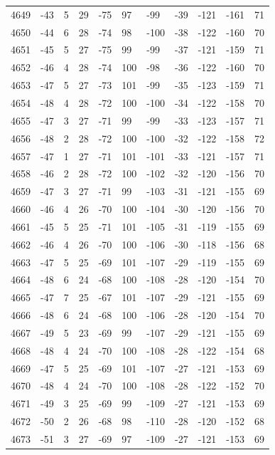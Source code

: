 \begin{table}[H]
\begin{tabular}{lllllllllll}
4649 & -43 & 5 & 29 & -75 & 97 & -99 & -39 & -121 & -161 & 71 \\
4650 & -44 & 6 & 28 & -74 & 98 & -100 & -38 & -122 & -160 & 70 \\
4651 & -45 & 5 & 27 & -75 & 99 & -99 & -37 & -121 & -159 & 71 \\
4652 & -46 & 4 & 28 & -74 & 100 & -98 & -36 & -122 & -160 & 70 \\
4653 & -47 & 5 & 27 & -73 & 101 & -99 & -35 & -123 & -159 & 71 \\
4654 & -48 & 4 & 28 & -72 & 100 & -100 & -34 & -122 & -158 & 70 \\
4655 & -47 & 3 & 27 & -71 & 99 & -99 & -33 & -123 & -157 & 71 \\
4656 & -48 & 2 & 28 & -72 & 100 & -100 & -32 & -122 & -158 & 72 \\
4657 & -47 & 1 & 27 & -71 & 101 & -101 & -33 & -121 & -157 & 71 \\
4658 & -46 & 2 & 28 & -72 & 100 & -102 & -32 & -120 & -156 & 70 \\
4659 & -47 & 3 & 27 & -71 & 99 & -103 & -31 & -121 & -155 & 69 \\
4660 & -46 & 4 & 26 & -70 & 100 & -104 & -30 & -120 & -156 & 70 \\
4661 & -45 & 5 & 25 & -71 & 101 & -105 & -31 & -119 & -155 & 69 \\
4662 & -46 & 4 & 26 & -70 & 100 & -106 & -30 & -118 & -156 & 68 \\
4663 & -47 & 5 & 25 & -69 & 101 & -107 & -29 & -119 & -155 & 69 \\
4664 & -48 & 6 & 24 & -68 & 100 & -108 & -28 & -120 & -154 & 70 \\
4665 & -47 & 7 & 25 & -67 & 101 & -107 & -29 & -121 & -155 & 69 \\
4666 & -48 & 6 & 24 & -68 & 100 & -106 & -28 & -120 & -154 & 70 \\
4667 & -49 & 5 & 23 & -69 & 99 & -107 & -29 & -121 & -155 & 69 \\
4668 & -48 & 4 & 24 & -70 & 100 & -108 & -28 & -122 & -154 & 68 \\
4669 & -47 & 5 & 25 & -69 & 101 & -107 & -27 & -121 & -153 & 69 \\
4670 & -48 & 4 & 24 & -70 & 100 & -108 & -28 & -122 & -152 & 70 \\
4671 & -49 & 3 & 25 & -69 & 99 & -109 & -27 & -121 & -153 & 69 \\
4672 & -50 & 2 & 26 & -68 & 98 & -110 & -28 & -120 & -152 & 68 \\
4673 & -51 & 3 & 27 & -69 & 97 & -109 & -27 & -121 & -153 & 69 \\

\end{tabular}
\end{table}
